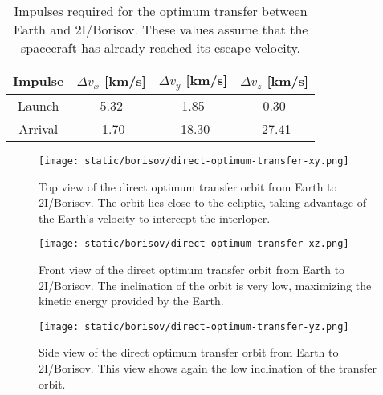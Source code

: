 \vspace{1cm}
\begin{table}[H]
  \centering
  \begin{tabular}{|c|c|c|c|}
    \hline
    Impulse & $\Delta v_x$ [km/s] & $\Delta v_y$ [km/s] & $\Delta v_z$ [km/s] \\
    \hline
    Launch  & 5.32                & 1.85                & 0.30                \\
    \hline
    Arrival & -1.70               & -18.30              & -27.41              \\
    \hline
  \end{tabular}
  \caption[Impulses required for the optimum transfer between Earth and
    2I/Borisov.]{Impulses required for the optimum transfer between Earth
    and 2I/Borisov. These values assume that the spacecraft has already
    reached its escape velocity.}
  \label{tab:borisov-direct-transfer-impulses}
\end{table}

\begin{figure}[H]
  \centering
  \texttt{[image: static/borisov/direct-optimum-transfer-xy.png]}
  \caption[Top view of the direct optimum transfer orbit from Earth to
    2I/Borisov]{
    Top view of the direct optimum transfer orbit from Earth to 2I/Borisov.
    The orbit lies close to the ecliptic, taking advantage of the Earth's
    velocity to intercept the interloper.
  }
  \label{fig:optimum_borisov_orbit_xy}
\end{figure}

\begin{figure}[H]
  \centering
  \texttt{[image: static/borisov/direct-optimum-transfer-xz.png]}
  \caption[Front view of the direct optimum transfer orbit from Earth to 2I/Borisov]{
    Front view of the direct optimum transfer orbit from Earth to 2I/Borisov.
    The inclination of the orbit is very low, maximizing the kinetic energy
    provided by the Earth.
  }
  \label{fig:optimum_borisov_orbit_yz}
\end{figure}

\begin{figure}[H]
  \centering
  \texttt{[image: static/borisov/direct-optimum-transfer-yz.png]}
  \caption[Side view of the direct optimum transfer orbit from Earth to 2I/Borisov]{
    Side view of the direct optimum transfer orbit from Earth to 2I/Borisov.
    This view shows again the low inclination of the transfer orbit.}
  \label{fig:optimum_borisov_orbit_xz}
\end{figure}

